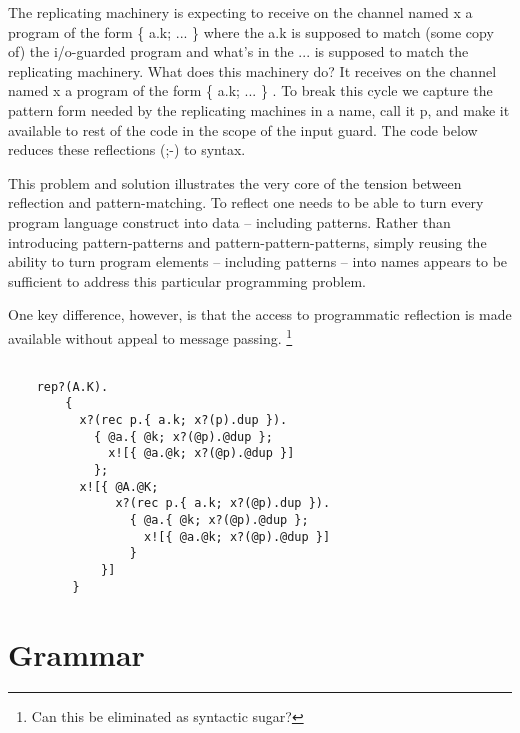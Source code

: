 The replicating machinery is expecting to receive on the channel named
\textsf{x} a program of the form \textsf{ \{ a.k; ... \} } where the
\textsf{a.k} is supposed to match (some copy of) the i/o-guarded
program and what's in the \textsf{...} is supposed to match the
replicating machinery. What does this machinery do? It receives on the
channel named \textsf{x} a program of the form \textsf{ \{ a.k; ... \}
}. To break this cycle we capture the pattern form needed by the
replicating machines in a name, call it \textsf{p}, and make it
available to rest of the code in the scope of the input guard. The
code below reduces these reflections (;-) to syntax.

This problem and solution illustrates the very core of the tension
between reflection and pattern-matching. To reflect one needs to be
able to turn every program language construct into data -- including
patterns. Rather than introducing pattern-patterns and
pattern-pattern-patterns, simply reusing the ability to turn program
elements -- including patterns -- into names appears to be sufficient
to address this particular programming problem. 

One key difference, however, is that the access to programmatic
reflection is made available without appeal to message
passing. \footnote{Can this be eliminated as syntactic sugar?}

\begin{verbatim}

    rep?(A.K).
        {                                       
          x?(rec p.{ a.k; x?(p).dup }).
            { @a.{ @k; x?(@p).@dup }; 
              x![{ @a.@k; x?(@p).@dup }] 
            };
          x![{ @A.@K; 
               x?(rec p.{ a.k; x?(@p).dup }).
                 { @a.{ @k; x?(@p).@dup }; 
                   x![{ @a.@k; x?(@p).@dup }] 
                 }
             }]
         }

\end{verbatim}


\section{Grammar}





